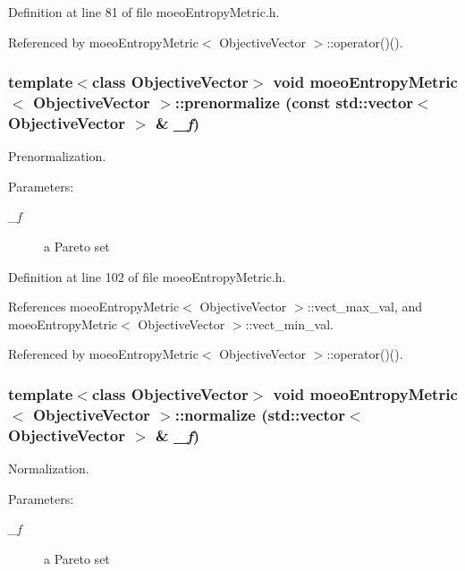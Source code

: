 Definition at line 81 of file moeo\-Entropy\-Metric.h.

Referenced by moeo\-Entropy\-Metric$<$ Objective\-Vector $>$::operator()().
\subsubsection{\setlength{\rightskip}{0pt plus 5cm}template$<$class Objective\-Vector$>$ void {\bf moeo\-Entropy\-Metric}$<$ Objective\-Vector $>$::prenormalize (const std::vector$<$ Objective\-Vector $>$ \& {\em \_\-f})\hspace{0.3cm}{\tt  [inline, private]}}\label{classmoeoEntropyMetric_51dd04bdd0ac6315f4f5956fb726cec1}


Prenormalization. 

\begin{Desc}
\item[Parameters:]
\begin{description}
\item[{\em \_\-f}]a Pareto set \end{description}
\end{Desc}


Definition at line 102 of file moeo\-Entropy\-Metric.h.

References moeo\-Entropy\-Metric$<$ Objective\-Vector $>$::vect\_\-max\_\-val, and moeo\-Entropy\-Metric$<$ Objective\-Vector $>$::vect\_\-min\_\-val.

Referenced by moeo\-Entropy\-Metric$<$ Objective\-Vector $>$::operator()().
\subsubsection{\setlength{\rightskip}{0pt plus 5cm}template$<$class Objective\-Vector$>$ void {\bf moeo\-Entropy\-Metric}$<$ Objective\-Vector $>$::normalize (std::vector$<$ Objective\-Vector $>$ \& {\em \_\-f})\hspace{0.3cm}{\tt  [inline, private]}}\label{classmoeoEntropyMetric_2ed5771c3c611634b415f4be48cad172}


Normalization. 

\begin{Desc}
\item[Parameters:]
\begin{description}
\item[{\em \_\-f}]a Pareto set \end{description}
\end{Desc}


